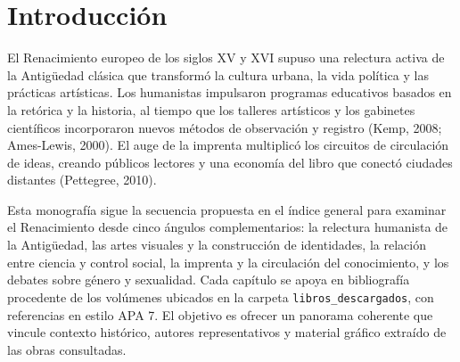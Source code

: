 \chapter*{Introducción}
El Renacimiento europeo de los siglos XV y XVI supuso una relectura activa de la Antigüedad clásica que transformó la cultura urbana, la vida política y las prácticas artísticas. Los humanistas impulsaron programas educativos basados en la retórica y la historia, al tiempo que los talleres artísticos y los gabinetes científicos incorporaron nuevos métodos de observación y registro (Kemp, 2008; Ames-Lewis, 2000). El auge de la imprenta multiplicó los circuitos de circulación de ideas, creando públicos lectores y una economía del libro que conectó ciudades distantes (Pettegree, 2010).

Esta monografía sigue la secuencia propuesta en el índice general para examinar el Renacimiento desde cinco ángulos complementarios: la relectura humanista de la Antigüedad, las artes visuales y la construcción de identidades, la relación entre ciencia y control social, la imprenta y la circulación del conocimiento, y los debates sobre género y sexualidad. Cada capítulo se apoya en bibliografía procedente de los volúmenes ubicados en la carpeta \texttt{libros\_descargados}, con referencias en estilo APA 7. El objetivo es ofrecer un panorama coherente que vincule contexto histórico, autores representativos y material gráfico extraído de las obras consultadas.
